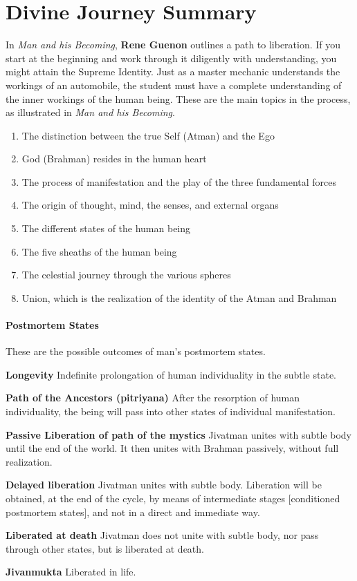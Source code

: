 \section{Divine Journey Summary}

In \emph{Man and his Becoming}, \textbf{Rene Guenon} outlines a path to liberation. If you start at the beginning and work through it diligently with understanding, you might attain the Supreme Identity. Just as a master mechanic understands the workings of an automobile, the student must have a complete understanding of the inner workings of the human being. These are the main topics in the process, as illustrated in \emph{Man and his Becoming}.

\begin{enumerate}
\item The distinction between the true Self (Atman) and the Ego 
\item God (Brahman) resides in the human heart 
\item The process of manifestation and the play of the three fundamental forces 
\item The origin of thought, mind, the senses, and external organs 
\item The different states of the human being 
\item The five sheaths of the human being 
\item The celestial journey through the various spheres 
\item Union, which is the realization of the identity of the Atman and Brahman 
\end{enumerate}
\paragraph{Postmortem States}
These are the possible outcomes of man's postmortem states.

\begin{description}
\item{\bfseries Longevity} Indefinite prolongation of human individuality in the subtle state.
\item{\bfseries Path of the Ancestors (pitriyana)} After the resorption of human individuality, the being will pass into other states of individual manifestation.
\item{\bfseries Passive Liberation of path of the mystics} Jivatman unites with subtle body until the end of the world. It then unites with Brahman passively, without full realization.
\item{\bfseries Delayed liberation} Jivatman unites with subtle body. Liberation will be obtained, at the end of the cycle, by means of intermediate stages [conditioned postmortem states], and not in a direct and immediate way.
\item{\bfseries Liberated at death} Jivatman does not unite with subtle body, nor pass through other states, but is liberated at death.
\item{\bfseries Jivanmukta} Liberated in life.
\end{description}

